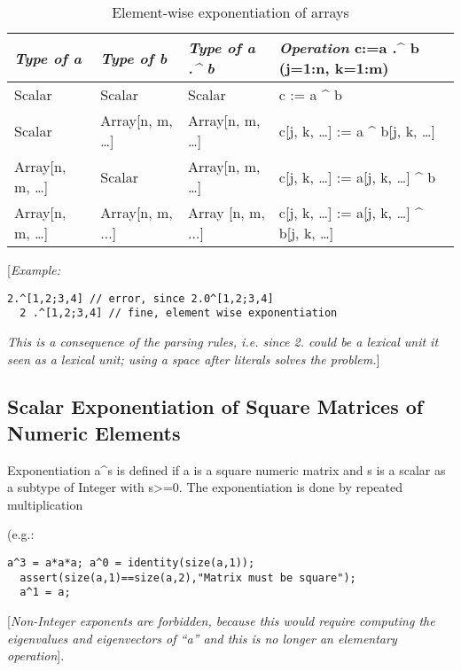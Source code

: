 \begin{longtable}[]{|l|l|l|l|}
\caption{Element-wise exponentiation of arrays}\\
\hline
\emph{Type of a} & \emph{Type of b} & \emph{Type of a .\^{} b} &
\emph{Operation} c:=a .\^{} b (j=1:n, k=1:m)\\ \hline
\endhead
Scalar & Scalar & Scalar & c := a \^{} b\\ \hline
Scalar & Array{[}n, m, \ldots{}{]} & Array{[}n, m, \ldots{}{]} & c{[}j,
k, \ldots{}{]} := a \^{} b{[}j, k, \ldots{}{]}\\ \hline
Array{[}n, m, \ldots{}{]} & Scalar & Array{[}n, m, \ldots{}{]} & c{[}j,
k, \ldots{}{]} := a{[}j, k, \ldots{}{]} \^{} b\\ \hline
Array{[}n, m, \ldots{}{]} & Array{[}n, m, ...{]} & Array {[}n, m, ...{]}
& c{[}j, k, \ldots{}{]} := a{[}j, k, \ldots{}{]} \^{} b{[}j, k,
\ldots{}{]}\\ \hline

\end{longtable}

{[}\emph{Example:}

\begin{lstlisting}[language=modelica]
  2.^[1,2;3,4] // error, since 2.0^[1,2;3,4]
  2 .^[1,2;3,4] // fine, element wise exponentiation
\end{lstlisting}
\emph{This is a consequence of the parsing rules, i.e. since 2. could be
a lexical unit it seen as a lexical unit; using a space after literals
solves the problem.}{]}

\subsection{Scalar Exponentiation of Square Matrices of Numeric Elements}

Exponentiation a\^{}s is defined if a is a square numeric matrix and s
is a scalar as a subtype of Integer with s\textgreater{}=0. The
exponentiation is done by repeated multiplication

(e.g.:
\begin{lstlisting}[language=modelica]
  a^3 = a*a*a; a^0 = identity(size(a,1));
  assert(size(a,1)==size(a,2),"Matrix must be square");
  a^1 = a;
\end{lstlisting}
{[}\emph{Non-Integer exponents are forbidden, because this would require
computing the eigenvalues and eigenvectors of ``a'' and this is no
longer an elementary operation}{]}.

